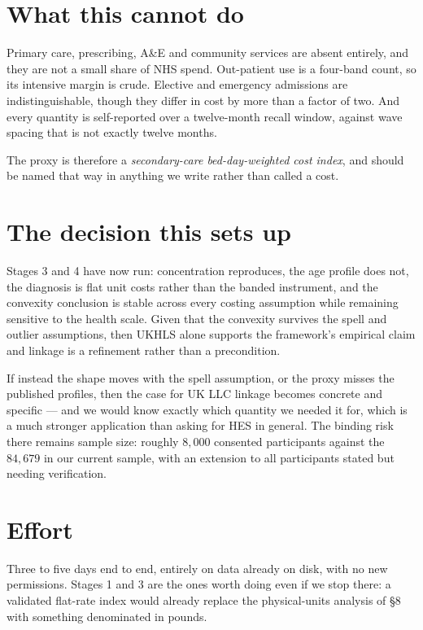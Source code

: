 \documentclass[11pt]{article}
\begin{document}
\section{What this cannot do}

Primary care, prescribing, A\&E and community services are absent entirely,
and they are not a small share of NHS spend. Out-patient use is a four-band
count, so its intensive margin is crude. Elective and emergency admissions
are indistinguishable, though they differ in cost by more than a factor of
two. And every quantity is self-reported over a twelve-month recall window,
against wave spacing that is not exactly twelve months.

The proxy is therefore a \emph{secondary-care bed-day-weighted cost index},
and should be named that way in anything we write rather than called a cost.

\section{The decision this sets up}

Stages 3 and 4 have now run: concentration reproduces, the age profile does
not, the diagnosis is flat unit costs rather than the banded instrument, and
the convexity conclusion is stable across every costing assumption while
remaining sensitive to the health scale. Given that the convexity survives the
spell and outlier assumptions, then UKHLS alone supports the framework's
empirical claim and linkage is a refinement rather than a precondition.

If instead the shape moves with the spell assumption, or the proxy misses
the published profiles, then the case for UK LLC linkage becomes concrete
and specific --- and we would know exactly which quantity we needed it for,
which is a much stronger application than asking for HES in general. The
binding risk there remains sample size: roughly $8{,}000$ consented
participants against the $84{,}679$ in our current sample, with an extension
to all participants stated but needing verification.

\section*{Effort}

Three to five days end to end, entirely on data already on disk, with no new
permissions. Stages 1 and 3 are the ones worth doing even if we stop there:
a validated flat-rate index would already replace the physical-units analysis
of \S8 with something denominated in pounds.
\end{document}
